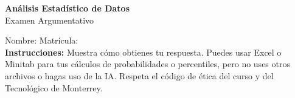 \documentclass[11pt]{article}
\begin{document}
\begin{center}
\large \textbf{An\'alisis Estad\'istico de Datos} \\
\large Examen Argumentativo
\end{center}

Nombre: \underline{\hspace*{3in}} \quad Matr\'icula:\underline{\hspace*{2in}} \\

\noindent \textbf{Instrucciones:} Muestra c\'omo obtienes tu respuesta. Puedes usar Excel 
o Minitab para tus cálculos de probabilidades o 
percentiles, pero no uses otros archivos o hagas uso de la IA. Respeta el 
c\'odigo de \'etica del curso y del Tecnol\'ogico 
de Monterrey.

\begin{enumerate}



\end{enumerate}
\end{document}
